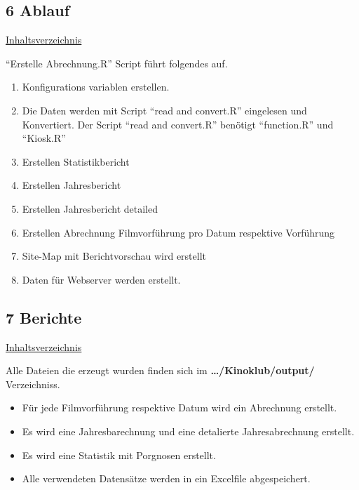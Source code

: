 \documentclass[
]{article}
\providecommand{\tightlist}{%
  \setlength{\itemsep}{0pt}\setlength{\parskip}{0pt}}
\begin{document}
\newpage

\subsection{6 Ablauf}\label{ablauf}

\hyperref[Inhaltsverzeichnis]{Inhaltsverzeichnis}

``Erstelle Abrechnung.R'' Script führt folgendes auf.

\begin{enumerate}
\def\labelenumi{\arabic{enumi}.}
\tightlist
\item
  Konfigurations variablen erstellen.
\item
  Die Daten werden mit Script ``read and convert.R'' eingelesen und
  Konvertiert. Der Script ``read and convert.R'' benötigt ``function.R''
  und ``Kiosk.R''
\item
  Erstellen Statistikbericht
\item
  Erstellen Jahresbericht
\item
  Erstellen Jahresbericht detailed
\item
  Erstellen Abrechnung Filmvorführung pro Datum respektive Vorführung
\item
  Site-Map mit Berichtvorschau wird erstellt
\item
  Daten für Webserver werden erstellt.
\end{enumerate}

\newpage

\subsection{7 Berichte}\label{berichte}

\hyperref[Inhaltsverzeichnis]{Inhaltsverzeichnis}

Alle Dateien die erzeugt wurden finden sich im
\textbf{\ldots/Kinoklub/output/} Verzeichniss.

\begin{itemize}
\tightlist
\item
  Für jede Filmvorführung respektive Datum wird ein Abrechnung erstellt.
\item
  Es wird eine Jahresbarechnung und eine detalierte Jahresabrechnung
  erstellt.
\item
  Es wird eine Statistik mit Porgnosen erstellt.
\item
  Alle verwendeten Datensätze werden in ein Excelfile abgespeichert.
\end{itemize}
\end{document}

